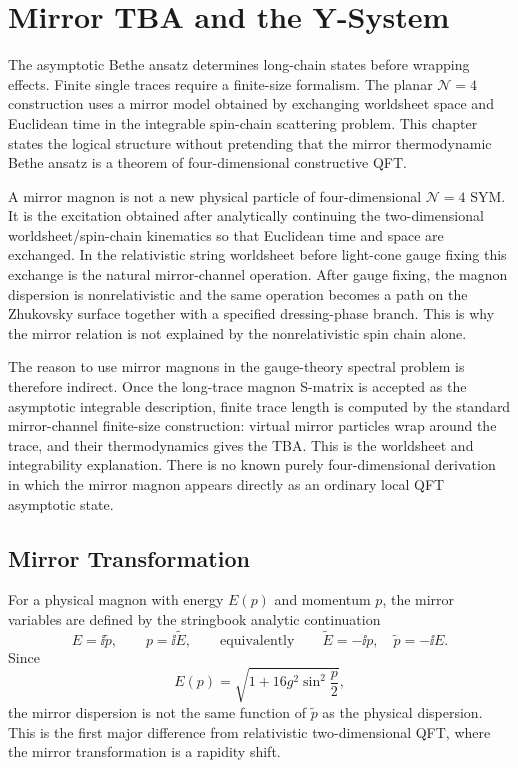 \chapter{Mirror TBA and the Y-System}
\label{ch:planar-n4-mirror-tba-y-system}

\ConventionsLorentzian

The asymptotic Bethe ansatz determines long-chain states before wrapping
effects.  Finite single traces require a finite-size formalism.  The planar
\(\mathcal N=4\) construction uses a mirror model obtained by exchanging
worldsheet space and Euclidean time in the integrable spin-chain scattering
problem.  This chapter states the logical structure without pretending that
the mirror thermodynamic Bethe ansatz is a theorem of four-dimensional
constructive QFT.

\begin{warning}
\label{warn:planar-n4-mirror-magnon-status}
A mirror magnon is not a new physical particle of four-dimensional
\(\mathcal N=4\) SYM.  It is the excitation obtained after analytically
continuing the two-dimensional worldsheet/spin-chain kinematics so that
Euclidean time and space are exchanged.  In the relativistic string
worldsheet before light-cone gauge fixing this exchange is the natural
mirror-channel operation.  After gauge fixing, the magnon dispersion is
nonrelativistic and the same operation becomes a path on the Zhukovsky
surface together with a specified dressing-phase branch.  This is why the
mirror relation is not explained by the nonrelativistic spin chain alone.

The reason to use mirror magnons in the gauge-theory spectral problem is
therefore indirect.  Once the long-trace magnon S-matrix is accepted as the
asymptotic integrable description, finite trace length is computed by the
standard mirror-channel finite-size construction: virtual mirror particles
wrap around the trace, and their thermodynamics gives the TBA.  This is the
worldsheet and integrability explanation.  There is no known purely
four-dimensional derivation in which the mirror magnon appears directly as an
ordinary local QFT asymptotic state.
\end{warning}

\section{Mirror Transformation}

For a physical magnon with energy \(E(p)\) and momentum \(p\), the mirror
variables are defined by the stringbook analytic continuation
\[
  E=\ii\widetilde p,\qquad
  p=\ii\widetilde E ,
  \qquad\text{equivalently}\qquad
  \widetilde E=-\ii p,\quad
  \widetilde p=-\ii E .
\]
Since
\[
  E(p)=\sqrt{1+16g^2\sin^2\frac p2},
\]
the mirror dispersion is not the same function of \(\widetilde p\) as the
physical dispersion.  This is the first major difference from relativistic
two-dimensional QFT, where the mirror transformation is a rapidity shift.

